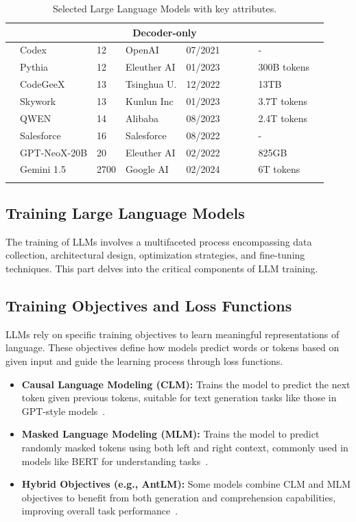 \begin{landscape}
\begin{longtable}{|l|l|l|l|l|l|l|l|l|l|}
		\multicolumn{10}{|c|}{\textbf{Decoder-only}} \\
		\hline
		& Codex & 12 & OpenAI & 07/2021 & \xmark & \cmark & \cmark & - & \xmark \\
		& Pythia & 12 & Eleuther AI & 01/2023 & \cmark & \cmark & \xmark & 300B tokens & \cmark \\
		& CodeGeeX & 13 & Tsinghua U. & 12/2022 & \cmark & \cmark & \xmark & 13TB & \cmark \\
		& Skywork & 13 & Kunlun Inc & 01/2023 & \xmark & \cmark & \xmark & 3.7T tokens & \xmark \\
		& QWEN & 14 & Alibaba & 08/2023 & \cmark & \cmark & \cmark & 2.4T tokens & \cmark \\
		& Salesforce & 16 & Salesforce & 08/2022 & \xmark & \cmark & \xmark & - & \xmark \\
		& GPT-NeoX-20B & 20 & Eleuther AI & 02/2022 & \cmark & \cmark & \xmark & 825GB & \cmark \\
		& Gemini 1.5 & 2700 & Google AI & 02/2024 & \xmark & \cmark & \cmark & 6T tokens & \xmark \\
		\hline
		
		\caption{Selected Large Language Models with key attributes.}
		\label{llm_table_final}
	\end{longtable}
\end{landscape}


\subsection{Training Large Language Models}
The training of LLMs involves a multifaceted process encompassing data collection, architectural design, optimization strategies, and fine-tuning techniques. This part delves into the critical components of LLM training.
\subsection{Training Objectives and Loss Functions}
 LLMs rely on specific training objectives to learn meaningful representations of language. These objectives define how models predict words or tokens based on given input and guide the learning process through loss functions.
\begin{itemize}
	\item \textbf{Causal Language Modeling (CLM):} Trains the model to predict the next token given previous tokens, suitable for text generation tasks like those in GPT-style models~\citep{jurafsky2000speech}.
	
	\item \textbf{Masked Language Modeling (MLM):} Trains the model to predict randomly masked tokens using both left and right context, commonly used in models like BERT for understanding tasks~\citep{jurafsky2000speech}.
	
	\item \textbf{Hybrid Objectives (e.g., AntLM):} Some models combine CLM and MLM objectives to benefit from both generation and comprehension capabilities, improving overall task performance~\citep{antlm2024}.
\end{itemize}
